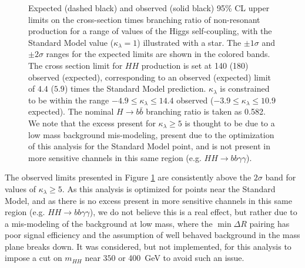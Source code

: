 \begin{figure}[ht]
  \centering
  \caption{\label{fig:nonres-limits}
    Expected (dashed black) and observed (solid black) 95\% CL upper limits on the cross-section times 
    branching ratio of non-resonant production 
    for a range of values of the Higgs self-coupling, with the Standard Model value ($\kappa_{\lambda} = 1$) illustrated 
    with a star. The \(\pm 1\sigma\) and \(\pm 2\sigma\) ranges for the expected limits are shown in the colored bands. 
    The cross section limit for $HH$ production is set at \SI{140}{\fb} (\SI{180}{\fb}) observed (expected), 
    corresponding to an observed (expected) limit of $4.4$ ($5.9$) times the Standard Model prediction. 
    $\kappa_{\lambda}$ is constrained to be within the range $-4.9 \leq \kappa_{\lambda} \leq 14.4$ observed 
    ($-3.9 \leq \kappa_{\lambda} \leq 10.9$ expected). The nominal \(H \rightarrow b\bar{b}\) branching ratio is 
    taken as 0.582. We note that the excess present for $\kappa_{\lambda}\geq 5$ is thought to be due to a low mass 
    background mis-modeling, present due to the optimization of this analysis for the Standard Model point, and is not present in more sensitive channels in this same region (e.g. $HH\rightarrow bb\gamma\gamma$).
  }
\end{figure}

The observed limits presented in Figure \ref{fig:nonres-limits} are consistently above the $2\sigma$ band for values of 
$\kappa_{\lambda} \geq 5$. As this analysis is optimized for points near the Standard Model, and as there is no excess present in more sensitive channels in this same region (e.g. $HH\rightarrow bb\gamma\gamma$), we do not believe this 
is a real effect, but rather due to a mis-modeling of the background at low mass, where the $\min{\Delta R}$ pairing 
has poor signal efficiency and the assumption of well behaved background in the mass plane breaks down. 
It was considered, but not implemented, for this analysis to impose a cut on $m_{HH}$ near $350$ or \SI{400}{\GeV} to avoid such an issue.

